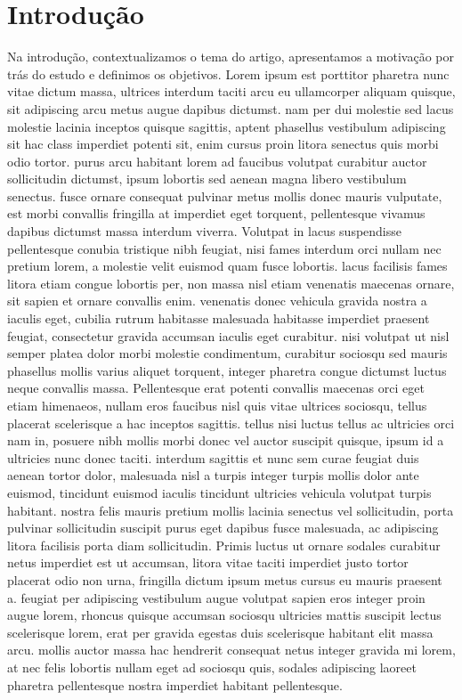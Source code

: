 \documentclass[12pt]{article}
\begin{document}
\section{Introdução} %
Na introdução, contextualizamos o tema do artigo, apresentamos a motivação por trás do estudo e definimos os objetivos. Lorem ipsum est porttitor pharetra nunc vitae dictum massa, ultrices interdum taciti arcu eu ullamcorper aliquam quisque, sit adipiscing arcu metus augue dapibus dictumst. nam per dui molestie sed lacus molestie lacinia inceptos quisque sagittis, aptent phasellus vestibulum adipiscing sit hac class imperdiet potenti sit, enim cursus proin litora senectus quis morbi odio tortor. purus arcu habitant lorem ad faucibus volutpat curabitur auctor sollicitudin dictumst, ipsum lobortis sed aenean magna libero vestibulum senectus. fusce ornare consequat pulvinar metus mollis donec mauris vulputate, est morbi convallis fringilla at imperdiet eget torquent, pellentesque vivamus dapibus dictumst massa interdum viverra. Volutpat in lacus suspendisse pellentesque conubia tristique nibh feugiat, nisi fames interdum orci nullam nec pretium lorem, a molestie velit euismod quam fusce lobortis. lacus facilisis fames litora etiam congue lobortis per, non massa nisl etiam venenatis maecenas ornare, sit sapien et ornare convallis enim. venenatis donec vehicula gravida nostra a iaculis eget, cubilia rutrum habitasse malesuada habitasse imperdiet praesent feugiat, consectetur gravida accumsan iaculis eget curabitur. nisi volutpat ut nisl semper platea dolor morbi molestie condimentum, curabitur sociosqu sed mauris phasellus mollis varius aliquet torquent, integer pharetra congue dictumst luctus neque convallis massa. Pellentesque erat potenti convallis maecenas orci eget etiam himenaeos, nullam eros faucibus nisl quis vitae ultrices sociosqu, tellus placerat scelerisque a hac inceptos sagittis. tellus nisi luctus tellus ac ultricies orci nam in, posuere nibh mollis morbi donec vel auctor suscipit quisque, ipsum id a ultricies nunc donec taciti. interdum sagittis et nunc sem curae feugiat duis aenean tortor dolor, malesuada nisl a turpis integer turpis mollis dolor ante euismod, tincidunt euismod iaculis tincidunt ultricies vehicula volutpat turpis habitant. nostra felis mauris pretium mollis lacinia senectus vel sollicitudin, porta pulvinar sollicitudin suscipit purus eget dapibus fusce malesuada, ac adipiscing litora facilisis porta diam sollicitudin. Primis luctus ut ornare sodales curabitur netus imperdiet est ut accumsan, litora vitae taciti imperdiet justo tortor placerat odio non urna, fringilla dictum ipsum metus cursus eu mauris praesent a. feugiat per adipiscing vestibulum augue volutpat sapien eros integer proin augue lorem, rhoncus quisque accumsan sociosqu ultricies mattis suscipit lectus scelerisque lorem, erat per gravida egestas duis scelerisque habitant elit massa arcu. mollis auctor massa hac hendrerit consequat netus integer gravida mi lorem, at nec felis lobortis nullam eget ad sociosqu quis, sodales adipiscing laoreet pharetra pellentesque nostra imperdiet habitant pellentesque.
\end{document}
